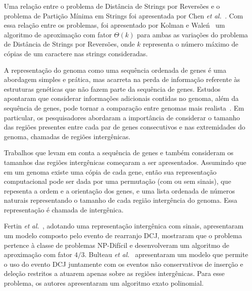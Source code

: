 Uma relação entre o problema de Distância de Strings por Reversões e o problema de Partição Mínima em Strings foi apresentada por Chen \textit{et al.}~\cite{2005-chen-etal}. Com essa relação entre os problemas, foi apresentado por Kolman e Wale{\'n}~\cite{2006-kolman-walen} um algoritmo de aproximação com fator $\Theta(k)$ para ambas as variações do problema de Distância de Strings por Reversões, onde $k$ representa o número máximo de cópias de um caractere nas strings consideradas.

A representação do genoma como uma sequência ordenada de genes é uma abordagem simples e prática, mas acarreta na perda de informação referente às estruturas genéticas que não fazem parte da sequência de genes. Estudos apontaram que considerar informações adicionais contidas no genoma, além da sequência de genes, pode tornar a comparação entre genomas mais realista~\cite{2016a-biller-etal, 2016b-biller-etal}. Em particular, os pesquisadores abordaram a importância de considerar o tamanho das regiões presentes entre cada par de genes consecutivos e nas extremidades do genoma, chamadas de regiões intergênicas. 

Trabalhos que levam em conta a sequência de genes e também consideram os tamanhos das regiões intergênicas começaram a ser apresentados. Assumindo que em um genoma existe uma cópia de cada gene, então sua representação computacional pode ser dada por uma permutação (com ou sem sinais), que repesenta a ordem e a orientação dos genes, e uma lista ordenada de números naturais representando o tamanho de cada região intergência do genoma. Essa representação é chamada de intergênica.

Fertin \textit{et al.}~\cite{2017-fertin-etal}, adotando uma representação intergênica com sinais, apresentaram um modelo composto pelo evento de rearranjo DCJ, mostraram que o problema pertence à classe de problemas NP-Difícil e desenvolveram um algoritmo de aproximação com fator $4/3$. Bulteau \textit{et al.}~\cite{2016b-bulteau-etal} apresentaram um modelo que permite o uso do evento DCJ juntamente com os eventos não conservativos de inserção e deleção restritos a atuarem apenas sobre as regiões intergênicas. Para esse problema, os autores apresentaram um algoritmo exato polinomial. 

